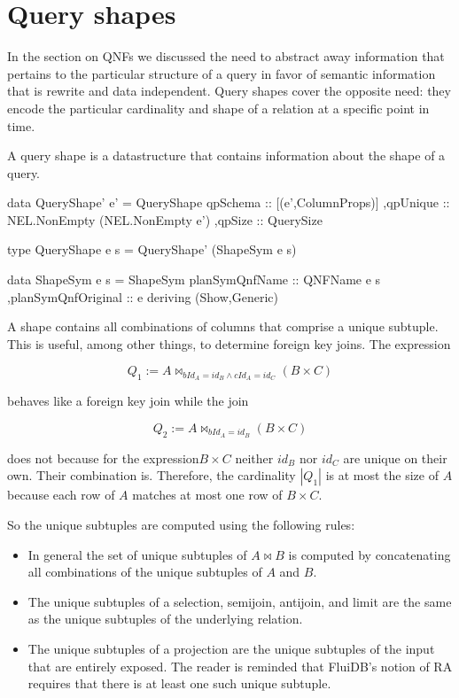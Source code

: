 \section{Query shapes}

In the section on QNFs we discussed the need to abstract away
information that pertains to the particular structure of a query in
favor of semantic information that is rewrite and data
independent. Query shapes cover the opposite need: they encode the
particular cardinality and shape of a relation at a specific point in
time.

A query shape is a datastructure that contains information about the
shape of a query.

\begin{haskellcode}
  data QueryShape' e' =
    QueryShape
    { qpSchema :: [(e',ColumnProps)]
      ,qpUnique :: NEL.NonEmpty (NEL.NonEmpty e')
      ,qpSize :: QuerySize
    }

  type QueryShape e s = QueryShape' (ShapeSym e s)

  data ShapeSym e s =
    ShapeSym { planSymQnfName :: QNFName e s
      ,planSymQnfOriginal :: e
    }
    deriving (Show,Generic)
\end{haskellcode}

A shape contains all combinations of columns that comprise a unique subtuple.
This is useful, among other things, to determine foreign key joins. The expression

\[Q_1 := A \Join_{bId_A = id_B \land cId_A = id_C} (B \times C)\]

behaves like a foreign key join while the join

\[Q_2 := A \Join_{bId_A = id_B} (B \times C)\]

does not because for the expression\(B \times C\) neither \(id_B\) nor \(id_C\) are unique on their own.
Their combination is. Therefore, the cardinality \(|Q_1|\) is at most the size of \(A\) because
each row of \(A\) matches at most one row of \(B \times C\).

So the unique subtuples are computed using the following rules:

\begin{itemize}
\item In general the set of unique subtuples of \(A \Join B\) is computed by
  concatenating all combinations of the unique subtuples of \(A\) and \(B\).
\item The unique subtuples of a selection, semijoin, antijoin, and limit are the same as the unique
  subtuples of the underlying relation.
\item The unique subtuples of a projection are the unique subtuples of the input that are entirely exposed.
  The reader is reminded that FluiDB's notion of RA requires that there is at least one
  such unique subtuple.
\end{itemize}

